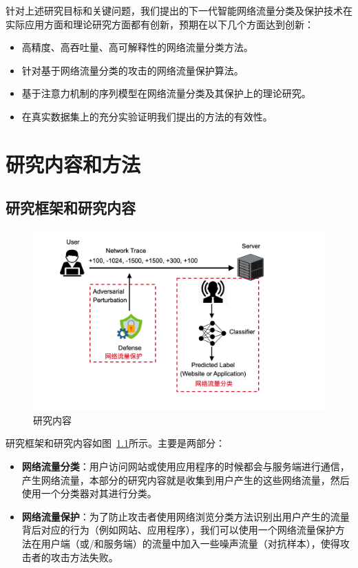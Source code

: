 \documentclass[degree=master,cjk-font=noto]{thuthesis}
\begin{document}
针对上述研究目标和关键问题，我们提出的下一代智能网络流量分类及保护技术在实际应用方面和理论研究方面都有创新，预期在以下几个方面达到创新：

\begin{itemize}
	\item 高精度、高吞吐量、高可解释性的网络流量分类方法。
	\item 针对基于网络流量分类的攻击的网络流量保护算法。
	\item 基于注意力机制的序列模型在网络流量分类及其保护上的理论研究。
	\item 在真实数据集上的充分实验证明我们提出的方法的有效性。
\end{itemize}


\chapter{研究内容和方法}

\section{研究框架和研究内容}

\begin{figure}[!htp]
	\centerline{\includegraphics[width=15cm]{framework.png}}
	\caption{研究内容}
	\label{framework}
\end{figure}

研究框架和研究内容如图~\ref{framework}所示。主要是两部分：

\begin{itemize}
	\item \textbf{网络流量分类}：用户访问网站或使用应用程序的时候都会与服务端进行通信，产生网络流量，本部分的研究内容就是收集到用户产生的这些网络流量，然后使用一个分类器对其进行分类。
	\item \textbf{网络流量保护}：为了防止攻击者使用网络浏览分类方法识别出用户产生的流量背后对应的行为（例如网站、应用程序），我们可以使用一个网络流量保护方法在用户端（或/和服务端）的流量中加入一些噪声流量（对抗样本），使得攻击者的攻击方法失败。
\end{itemize}
\end{document}

